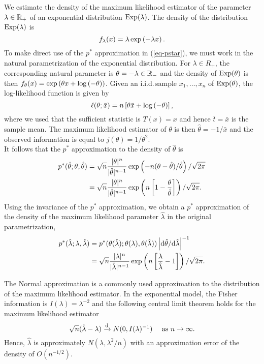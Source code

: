 \begin{example}
    We estimate the density of the maximum likelihood estimator of the parameter $\lambda \in \mathbb{R}_+$ of an exponential distribution ${\textrm{Exp}}(\lambda)$. The density of the distribution ${\textrm{Exp}}(\lambda)$ is
    \begin{equation*}
        f_\lambda(x) = \lambda \exp\left(-\lambda x\right).
    \end{equation*}
    To make direct use of the $p^*$ approximation in (\ref{eq-pstar}), we must work in the natural parametrization of the exponential distribution. For $\lambda \in R_+$, the corresponding natural parameter is $\theta = -\lambda \in \mathbb{R}_-$ and the density of ${\textrm{Exp}}(\theta)$ is then $f_\theta(x) = \exp\left( \theta x + \log\left(-\theta\right)\right)$. Given an i.i.d.\,sample $x_1, \ldots, x_n$ of ${\textrm{Exp}}(\theta)$, the log-likelihood function is given by 
    \begin{equation*}
        \ell(\theta; \bar x) = n\left[\theta \bar x + \log\left(-\theta\right)\right],
    \end{equation*}
    where we used that the sufficient statistic is $T(x) = x$ and hence $\bar t = \bar x$ is the sample mean. The maximum likelihood estimator of $\theta$ is then $\hat\theta = -1/\bar x$ and the observed information is equal to $j(\theta) = 1/\theta^2$.
    \\
    It follows that the $p^*$ approximation to the density of $\hat\theta$ is
    \begin{align*}
        p^*(\hat\theta; \theta, \hat\theta) 
        &= \sqrt{n} \frac{|\theta|^n}{|\hat\theta|^{n-1}}\exp\left(-n(\theta - \hat\theta)/\hat\theta\right) / \sqrt{2\pi}\\
        &= \sqrt{n} \frac{|\theta|^n}{|\hat\theta|^{n-1}}\exp\left(n\left[1 - \frac{\theta}{\hat\theta}\right]\right) / \sqrt{2\pi}.
    \end{align*}
    Using the invariance of the $p^*$ approximation, we obtain a $p^*$ approximation of the density of the maximum likelihood parameter $\hat\lambda$ in the original parametrization,
    \begin{align}
        p^*(\hat\lambda; \lambda, \hat\lambda) 
        &= p^*(\theta(\hat\lambda); \theta(\lambda), \theta(\hat\lambda)) \left|\text{d} \hat\theta / \text{d} \hat\lambda\right|^{-1} \nonumber\\
        &= \sqrt{n} \frac{|\lambda|^n}{|\hat\lambda|^{n-1}}\exp\left(n\left[\frac{\lambda}{\hat\lambda} - 1\right]\right) / \sqrt{2\pi}. \label{eq-pstar-lambda}
    \end{align}
    
    The Normal approximation is a commonly used approximation to the distribution of the maximum likelihood estimator. In the exponential model, the Fisher information is $I(\lambda) = \lambda^{-2}$ and the following central limit theorem holds for the maximum likelihood estimator \cite[Example 3.12]{lehmann2006theory}
    \begin{equation} \label{eq-normal-lambda}
        \sqrt{n}(\hat\lambda - \lambda) \xrightarrow[]{\text{d}} N(0, I(\lambda)^{-1})\ \ \ \  {\textrm{as }} n \rightarrow \infty.
    \end{equation}
    Hence, $\hat\lambda$ is approximately $N(\lambda, \lambda^2/n)$ with an approximation error of the density of $O(n^{-1/2})$. 
    

\end{example}
